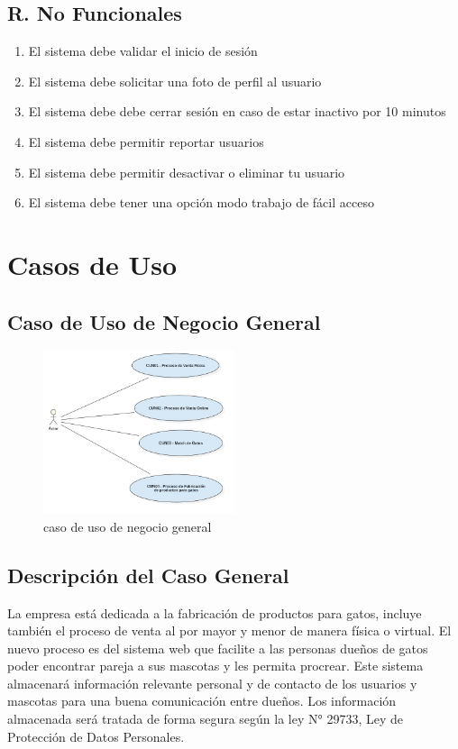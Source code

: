\documentclass{article}
\begin{document}
\subsection{R. No Funcionales}
\begin{enumerate}
    \item El sistema debe validar el inicio de sesión
    \item El sistema debe solicitar una foto de perfil al usuario
    \item El sistema debe debe cerrar sesión en caso de estar inactivo por 10 minutos
    \item El sistema debe permitir reportar usuarios
    \item El sistema debe permitir desactivar o eliminar tu usuario
    \item El sistema debe tener una opción modo trabajo de fácil acceso
\end{enumerate}
\clearpage
\section{Casos de Uso}
\subsection{Caso de Uso de Negocio General}
\begin{figure}[h]
    \begin{center}
        \includegraphics[width=0.5\textwidth]{images/Caso de uso general v2.png}
        \caption{caso de uso de negocio general}
    \end{center}
\end{figure}
\subsection{Descripción del Caso General}
La empresa está dedicada a la fabricación de productos para gatos, incluye también el proceso de venta al por mayor y menor de manera física o virtual.
El nuevo proceso es del sistema web que facilite a las personas dueños de gatos poder encontrar pareja a sus mascotas y les permita procrear. Este sistema almacenará información relevante personal y de contacto de los usuarios y mascotas para una buena comunicación entre dueños. Los información almacenada será tratada de forma segura según la ley N° 29733, Ley de Protección de Datos Personales.
\clearpage
\end{document}
